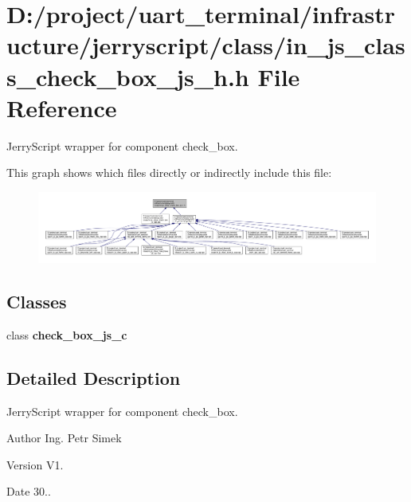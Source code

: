 \section{D\+:/project/uart\+\_\+terminal/infrastructure/jerryscript/class/in\+\_\+js\+\_\+class\+\_\+check\+\_\+box\+\_\+js\+\_\+h.h File Reference}
\label{in__js__class__check__box__js__h_8h}


Jerry\+Script wrapper for component check\+\_\+box.  


This graph shows which files directly or indirectly include this file\+:
\nopagebreak
\begin{figure}[H]
\begin{center}
\leavevmode
\includegraphics[width=350pt]{in__js__class__check__box__js__h_8h__dep__incl}
\end{center}
\end{figure}
\subsection*{Classes}
\begin{DoxyCompactItemize}
\item 
class \textbf{ check\+\_\+box\+\_\+js\+\_\+c}
\end{DoxyCompactItemize}


\subsection{Detailed Description}
Jerry\+Script wrapper for component check\+\_\+box. 

\begin{DoxyAuthor}{Author}
Ing. Petr Simek 
\end{DoxyAuthor}
\begin{DoxyVersion}{Version}
V1. 
\end{DoxyVersion}
\begin{DoxyDate}{Date}
30.. 
\end{DoxyDate}
